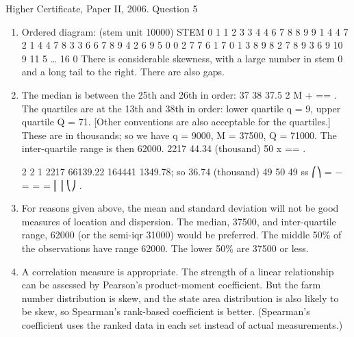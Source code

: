 \documentclass[a4paper,12pt]{article}
\begin{document}
Higher Certificate, Paper II, 2006.  Question 5 
\begin{enumerate} 
\item  Ordered diagram: (stem unit 10000) 
          STEM    0  1 1 2 3 3 4 4 6 7 8 8 9 9    1  4 4 7    2  1 4 4 7 8    3  3 6 6 7 8 9    4  2 6 9    5  0 0 2 7 7    6  1    7  0 1 3 8 9    8  2 7 8    9  3 6 9  10  9  11  5  …   16  0 
 There is considerable skewness, with a large number in stem 0 and a long tail to the right.  There are also gaps. 
\item  The median is between the 25th and 26th in order:  37 38 37.5 2 M + == . 
 The quartiles are at the 13th and 38th in order:  lower quartile q = 9, upper quartile Q = 71.  [Other conventions are also acceptable for the quartiles.] 
 These are in thousands;  so we have q = 9000, M = 37500, Q = 71000.  The inter-quartile range is then 62000. 
  2217 44.34 (thousand) 50 x == . 
 
 
2 2 1 2217 66139.22 164441 1349.78; so 36.74 (thousand) 49 50 49 ss ⎛⎞ = − = = = ⎜⎟ ⎝⎠ . 
 
 
\item  For reasons given above, the mean and standard deviation will not be good measures of location and dispersion.  The median, 37500, and inter-quartile range, 62000 (or the semi-iqr 31000) would be preferred. 
 The middle 50\% of the observations have range 62000.  The lower 50\% are 37500 or less. 
 
 
\item  A correlation measure is appropriate.  The strength of a linear relationship can be assessed by Pearson's product-moment coefficient.  But the farm number distribution is skew, and the state area distribution is also likely to be skew, so Spearman's rank-based coefficient is better.  (Spearman's coefficient uses the ranked data in each set instead of actual measurements.) 
\end{enumerate}
\end{document}

